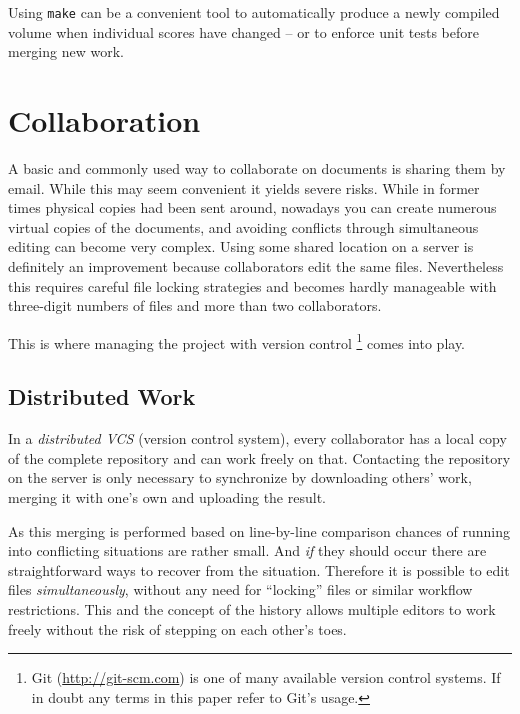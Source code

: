 \documentclass[11pt,a4paper]{article}
\begin{document}
Using \texttt{make} can be a convenient tool to automatically produce a newly compiled
volume when individual scores have changed -- or to enforce unit tests before merging
new work.

\section{Collaboration}\label{sec:collaboration}
A basic and commonly used way to collaborate on documents is sharing them by email.
While this may seem convenient it yields severe risks. While in former times physical
copies had been sent around, nowadays you can create numerous virtual copies of
the documents, and avoiding conflicts through simultaneous editing can
become very complex. Using some shared location on a server is definitely an improvement
because collaborators edit the same files. Nevertheless this requires careful file locking
strategies and becomes hardly manageable with three-digit numbers of files and more than
two collaborators.

This is where managing the project with version control%
\footnote{Git (\url{http://git-scm.com}) is one of many available version control systems.
If in doubt any terms in this paper refer to Git's usage.}
comes into play.

\subsection{Distributed Work}
In a \textsl{distributed VCS} (version control system), every collaborator
has a local copy of the complete repository and can work freely on that.
Contacting the repository on the server is only necessary to synchronize by downloading
others' work, merging it with one's own and uploading the result.

As this merging is performed based on line-by-line comparison chances of running into
conflicting situations are rather small. And \emph{if} they should occur there are
straightforward ways to recover from the situation. Therefore it is possible to edit files
\emph{simultaneously}, without any need for “locking” files or similar workflow
restrictions. This and the concept of the history allows multiple editors to work freely without the risk of stepping on each other's toes. 
\end{document}
